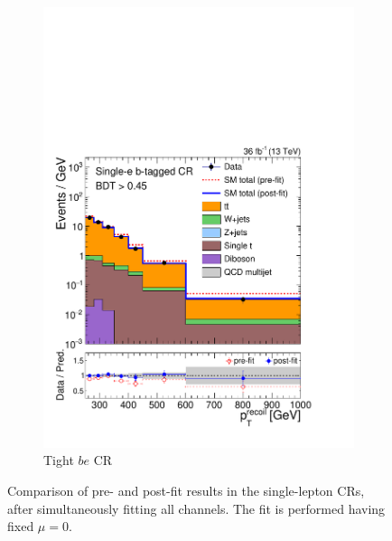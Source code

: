 \begin{figure}[]
\begin{center}
\begin{subfigure}[t]{0.24\textwidth}
            \includegraphics[width=\textwidth]{figures/monotop/postfit/stackedPostfit_singleelectrontop_monotop.pdf}
            \caption{Tight $be$ CR}
        \end{subfigure}
        \caption{Comparison of pre- and post-fit results in the single-lepton CRs, after simultaneously fitting all channels.
        The fit is performed having fixed $\mu=0$.}
        \label{fig:mt:postfit_wtop}
    \end{center}
\end{figure}

